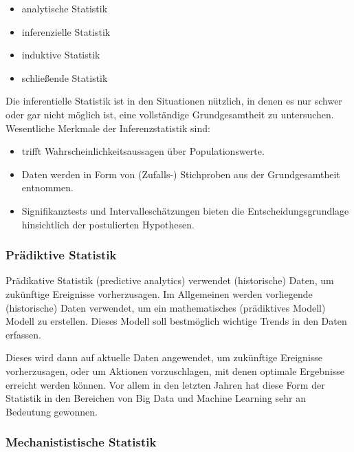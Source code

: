 \documentclass[]{article}
\providecommand{\tightlist}{%
  \setlength{\itemsep}{0pt}\setlength{\parskip}{0pt}}
\begin{document}
\begin{itemize}
\tightlist
\item
  analytische Statistik
\item
  inferenzielle Statistik
\item
  induktive Statistik
\item
  schließende Statistik
\end{itemize}

Die inferentielle Statistik ist in den Situationen nützlich, in denen es
nur schwer oder gar nicht möglich ist, eine vollständige Grundgesamtheit
zu untersuchen. Wesentliche Merkmale der Inferenzstatistik sind:

\begin{itemize}
\tightlist
\item
  trifft Wahrscheinlichkeitsaussagen über Populationswerte.
\item
  Daten werden in Form von (Zufalls-) Stichproben aus der
  Grundgesamtheit entnommen.
\item
  Signifikanztests und Intervalleschätzungen bieten die
  Entscheidungsgrundlage hinsichtlich der postulierten Hypothesen.
\end{itemize}

\subsubsection*{Prädiktive Statistik}\label{pradiktive-statistik}

Prädikative Statistik (predictive analytics) verwendet (historische)
Daten, um zukünftige Ereignisse vorherzusagen. Im Allgemeinen werden
vorliegende (historische) Daten verwendet, um ein mathematisches
(prädiktives Modell) Modell zu erstellen. Dieses Modell soll bestmöglich
wichtige Trends in den Daten erfassen.

Dieses wird dann auf aktuelle Daten angewendet, um zukünftige Ereignisse
vorherzusagen, oder um Aktionen vorzuschlagen, mit denen optimale
Ergebnisse erreicht werden können. Vor allem in den letzten Jahren hat
diese Form der Statistik in den Bereichen von Big Data und Machine
Learning sehr an Bedeutung gewonnen.

\subsubsection*{Mechanististische
Statistik}\label{mechanististische-statistik}
\end{document}
